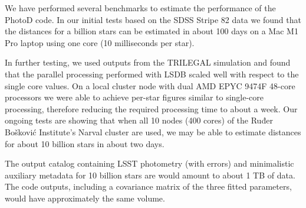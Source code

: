 We have performed several benchmarks to estimate the performance of the PhotoD code. In our initial tests based on the SDSS Stripe 82 data we found that the distances for a billion stars can be estimated in about 100 days on a Mac M1 Pro laptop using one core (10 milliseconds per star). 

In further testing, we used outputs from the TRILEGAL simulation and found that the parallel processing performed with LSDB scaled well with respect to the single core values. On a local cluster node with dual AMD EPYC 9474F 48-core processors we were able to achieve per-star figures similar to single-core processing, therefore reducing the required processing time to about a week. Our ongoing tests are showing that when all 10 nodes (400 cores) of the Ruđer Bošković Institute's Narval cluster are used, we may be able to estimate distances for about 10 billion stars in about two days. 

The output catalog containing LSST photometry (with errors) and minimalistic auxiliary metadata for 10 billion stars are would amount to about 1 TB of data. The code outputs, including a covariance matrix of the three fitted parameters, would have approximately the same volume. 
